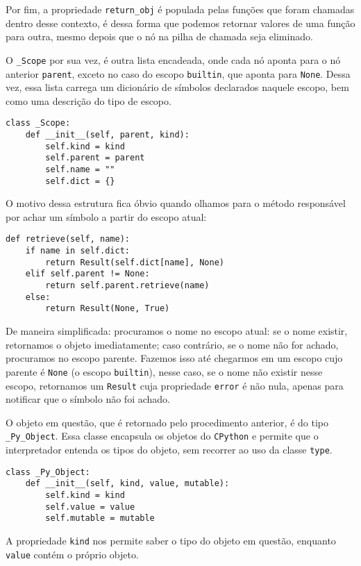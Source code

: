Por fim, a propriedade \verb|return_obj| é populada
pelas funções que foram chamadas dentro desse contexto,
é dessa forma que podemos retornar valores de uma função
para outra, mesmo depois que o nó na pilha de chamada seja
eliminado.

 
O \verb|_Scope| por sua vez, é outra lista encadeada,
onde cada nó aponta para o nó anterior \verb|parent|,
exceto no caso do escopo \verb|builtin|, que aponta para
\verb|None|.
Dessa vez, essa lista carrega um dicionário de símbolos
declarados naquele escopo, bem como uma descrição do tipo
de escopo.

\begin{lstlisting}
class _Scope:
    def __init__(self, parent, kind):
        self.kind = kind
        self.parent = parent
        self.name = ""
        self.dict = {}
\end{lstlisting}

O motivo dessa estrutura fica óbvio quando olhamos para o
método responsável por achar um símbolo a partir do escopo
atual:

\begin{lstlisting}
def retrieve(self, name):
    if name in self.dict:
        return Result(self.dict[name], None)
    elif self.parent != None:
        return self.parent.retrieve(name)
    else:
        return Result(None, True)
\end{lstlisting}

\noindent De maneira simplificada: procuramos o nome no
escopo atual: se o nome existir, retornamos o objeto
imediatamente; caso contrário, se o nome não for achado,
procuramos no escopo parente.
Fazemos isso até chegarmos em um escopo cujo
parente é \verb|None| (o escopo \verb|builtin|), nesse caso,
se o nome não existir nesse escopo, retornamos um
\verb|Result| cuja propriedade \verb|error| é não nula,
apenas para notificar que o símbolo não foi achado.

O objeto em questão, que é retornado pelo procedimento
anterior, é do tipo \verb|_Py_Object|. Essa classe encapsula
os objetos do \texttt{CPython} e permite que o interpretador
entenda os tipos do objeto, sem recorrer ao uso da classe
\verb|type|.

\begin{lstlisting}
class _Py_Object:
    def __init__(self, kind, value, mutable):
        self.kind = kind
        self.value = value
        self.mutable = mutable
\end{lstlisting}

\noindent A propriedade \verb|kind| nos permite saber o tipo
do objeto em questão, enquanto \verb|value| contém o próprio
objeto.

